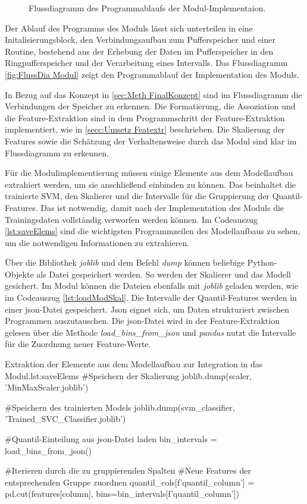 \begin{figure}[p]
    \caption{Flussdiagramm des Programmablaufs der Modul-Implementaion.}
    \label{fig:FlussDia Modul}
\end{figure}

Der Ablauf des Programms des Moduls lässt sich unterteilen in eine Initalisierungsblock, den Verbindungsaufbau zum Pufferspeicher und einer Routine, bestehend aus der Erhebung der Daten im Pufferspeicher in den Ringpufferspeicher und der Verarbeitung eines Intervalls. Das Flussdiagramm \autoref{fig:FlussDia Modul} zeigt den Programmablauf der Implementation des Moduls. \par

In Bezug auf das Konzept in \autoref{sec:Meth FinalKonzept} sind im Flussdiagramm die Verbindungen der Speicher zu erkennen. Die Formatierung, die Assoziation und die Feature-Extraktion sind in dem Programmschritt der Feature-Extraktion implementiert, wie in \autoref{secc:Umsetz Featextr} beschrieben. Die Skalierung der Features sowie die Schätzung der Verhaltensweise durch das Modul sind klar im Flussdiagramm zu erkennen. \par

Für die Modulimplementierung müssen einige Elemente aus dem Modellaufbau extrahiert werden, um sie anschließend einbinden zu können. Das beinhaltet die trainierte SVM, den Skalierer und die Intervalle für die Gruppierung der Quantil-Features. Das ist notwendig, damit nach der Implementation des Moduls die Trainingsdaten vollständig verworfen werden können. Im Codeauszug \ref{lst:saveElems} sind die wichtigsten Programmzeilen des Modellaufbaus zu sehen, um die notwendigen Informationen zu extrahieren.\par

Über die Bibliothek \textit{joblib} und dem Befehl \textit{dump} können beliebige Python-Objekte als Datei gespeichert werden. So werden der Skalierer und das Modell gesichert. Im Modul können die Dateien ebenfalls mit \textit{joblib} geladen werden, wie im Codeauszug \ref{lst:loadModSkal}. Die Intervalle der Quantil-Features werden in einer json-Datei gespeichert. Json eignet sich, um Daten strukturiert zwischen Programmen auszutauschen. Die json-Datei wird in der Feature-Extraktion gelesen über die Methode \textit{load\_bins\_from\_json} und \textit{pandas} nutzt die Intervalle für die Zuordnung neuer Feature-Werte.

\begin{pythoncode}{Extraktion der Elemente aus dem Modellaufbau zur Integration in das Modul.}{lst:saveElems}
#Speichern der Skalierung 
joblib.dump(scaler, 'MinMaxScaler.joblib')

#Speichern des trainierten Models
joblib.dump(svm_classifier, 'Trained_SVC_Classifier.joblib')


#Quantil-Einteilung aus json-Datei laden
bin_intervals = load_bins_from_json()

#Iterieren durch die zu gruppierenden Spalten
#Neue Features der entsprechenden Gruppe zuordnen 
quantil_cols[f'quantil_{column}'] = pd.cut(features[column], 
                                       bins=bin_intervals[f'quantil_{column}'])
\end{pythoncode}                                       

